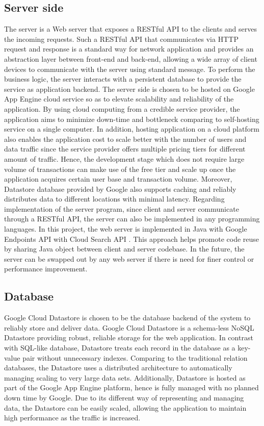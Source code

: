 \subsection{Server side}
The server is a Web server that exposes a RESTful API to the clients and serves the incoming requests. Such a RESTful
API that communicates via HTTP request and response is a standard way for network application and provides an
abstraction layer between front-end and back-end, allowing a wide array of client devices to communicate with the
server using standard message. To perform the business logic, the server interacts with a persistent database to provide
the service as application backend.  The server side is chosen to be hosted on Google App Engine cloud service so as to
elevate scalability and reliability of the application. By using cloud computing from a credible service provider, the
application aims to minimize down-time and bottleneck comparing to self-hosting service on a single computer. In
addition, hosting application on a cloud platform also enables the application cost to scale better with the number of
users and data traffic since the service provider offers multiple pricing tiers for different amount of traffic. Hence,
the development stage which does not require large volume of transactions can make use of the free tier and scale up
once the application acquires certain user base and transaction volume. Moreover, Datastore database provided by Google
also supports caching and reliably distributes data to different locations with minimal latency.  Regarding
implementation of the server program, since client and server communicate through a RESTful API, the server can also be
implemented in any programming languages. In this project, the web server is implemented in Java with Google Endpoints
API \cite{Cloud Endpoints} with Cloud Search API \cite{SearchAPI}.  This approach helps promote code reuse by sharing
Java object between client and server codebase. In the future, the server can be swapped out by any web server if there
is need for finer control or performance improvement.

\subsection{Database}
Google Cloud Datastore is chosen to be the database backend of the system to reliably store and deliver data. Google
Cloud Datastore is a schema-less NoSQL Datastore providing robust, reliable storage for the web application. In
contrast with SQL-like database, Datastore treats each record in the database as a key-value pair without unnecessary
indexes. Comparing to the traditional relation databases, the Datastore uses a distributed architecture to automatically
managing scaling to very large data sets. Additionally, Datastore is hosted as part of the Google App Engine platform,
hence is fully managed with no planned down time by Google. Due to its different way of representing and managing data,
the Datastore can be easily scaled, allowing the application to maintain high performance as the traffic is increased.


